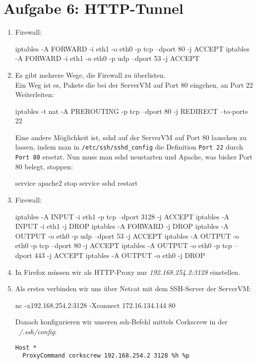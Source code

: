 \documentclass[a4paper,10pt]{scrartcl}
\begin{document}
\section*{Aufgabe 6: HTTP-Tunnel}
\label{sec:Aufgabe 6: HTTP-Tunnel}
\begin{enumerate}[\bfseries 1.]
	\item
        Firewall:
        \begin{rootcommands}
iptables -A FORWARD -i eth1 -o eth0 -p tcp --dport 80 -j ACCEPT
iptables -A FORWARD -i eth1 -o eth0 -p udp --dport 53 -j ACCEPT
		\end{rootcommands}

	\item
        Es gibt mehrere Wege, die Firewall zu überlisten.\\
        Ein Weg ist es, Pakete die bei der ServerVM auf Port 80 eingehen,
        an Port 22 Weiterleiten:
		\begin{rootcommands}
iptables -t nat -A PREROUTING -p tcp --dport 80 -j REDIRECT --to-ports 22
		\end{rootcommands}

        Eine andere Möglichkeit ist, sshd auf der ServerVM auf Port 80 lauschen
        zu lassen, indem man in \texttt{/etc/ssh/sshd\_config} die Definition
        \texttt{Port 22} durch \texttt{Port 80} ersetzt. Nun muss man sshd neustarten
        und Apache, was bisher Port 80 belegt, stoppen:

        \begin{rootcommands}
service apache2 stop
service sshd restart
        \end{rootcommands}

	\item
        Firewall:
	    \begin{rootcommands}
iptables -A INPUT -i eth1 -p tcp --dport 3128 -j ACCEPT
iptables -A INPUT -i eth1 -j DROP
iptables -A FORWARD -j DROP
iptables -A OUTPUT -o eth0 -p udp --dport 53 -j ACCEPT
iptables -A OUTPUT -o eth0 -p tcp --dport 80 -j ACCEPT
iptables -A OUTPUT -o eth0 -p tcp --dport 443 -j ACCEPT
iptables -A OUTPUT -o eth0 -j DROP
	    \end{rootcommands}

	\item
        In Firefox müssen wir als HTTP-Proxy nur \textit{192.168.254.2:3128}
        einstellen.

	\item
        Als erstes verbinden wir uns über Netcat mit dem SSH-Server der ServerVM:
        \begin{usercommands}
nc -x192.168.254.2:3128 -Xconnect 172.16.134.144 80
        \end{usercommands}
		Danach konfigurieren wir unseren ssh-Befehl mittels Corkscrew in der
		\textit{~/.ssh/config}:\\
		\begin{lstlisting}
Host *
  ProxyCommand corkscrew 192.168.254.2 3128 %h %p
		\end{lstlisting}


\end{enumerate}
\end{document}
